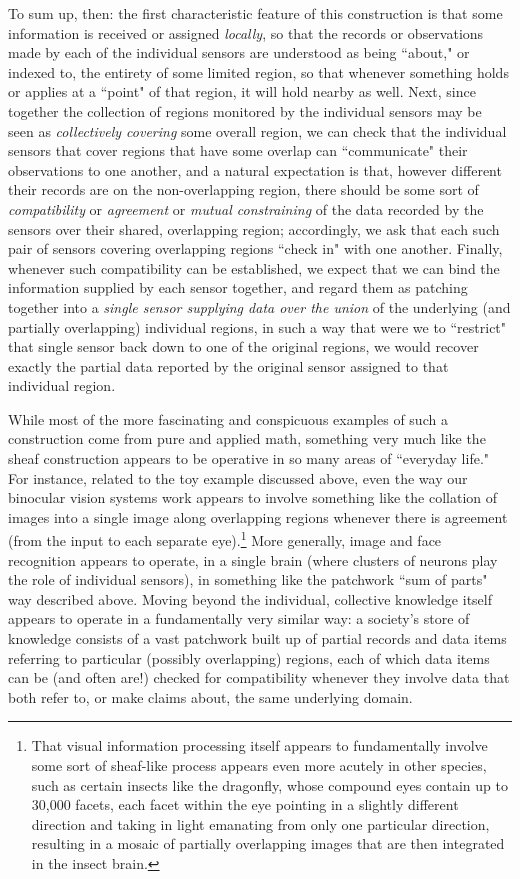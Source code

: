 \documentclass[11pt]{book}
\theoremstyle{definition}
\theoremstyle{definition}
\theoremstyle{definition}
\theoremstyle{theorem}
\theoremstyle{definition}
\begin{document}
	To sum up, then: the first characteristic feature of this construction is that some information is received or assigned \textit{locally}, so that the records or observations made by each of the individual sensors are understood as being ``about," or indexed to, the entirety of some limited region, so that whenever something holds or applies at a ``point" of that region, it will hold nearby as well. Next, since together the collection of regions monitored by the individual sensors may be seen as \textit{collectively covering} some overall region, we can check that the individual sensors that cover regions that have some overlap can ``communicate" their observations to one another, and a natural expectation is that, however different their records are on the non-overlapping region, there should be some sort of \textit{compatibility} or \textit{agreement} or \textit{mutual constraining} of the data recorded by the sensors over their shared, overlapping region; accordingly, we ask that each such pair of sensors covering overlapping regions ``check in" with one another. Finally, whenever such compatibility can be established, we expect that we can bind the information supplied by each sensor together, and regard them as patching together into a \textit{single sensor supplying data over the union} of the underlying (and partially overlapping) individual regions, in such a way that were we to ``restrict" that single sensor back down to one of the original regions, we would recover exactly the partial data reported by the original sensor assigned to that individual region. \par 
	While most of the more fascinating and conspicuous examples of such a construction come from pure and applied math, something very much like the sheaf construction appears to be operative in so many areas of ``everyday life." For instance, related to the toy example discussed above, even the way our binocular vision systems work appears to involve something like the collation of images into a single image along overlapping regions whenever there is agreement (from the input to each separate eye).\footnote{That visual information processing itself appears to fundamentally involve some sort of sheaf-like process appears even more acutely in other species, such as certain insects like the dragonfly, whose compound eyes contain up to 30,000 facets, each facet within the eye pointing in a slightly different direction and taking in light emanating from only one particular direction, resulting in a mosaic of partially overlapping images that are then integrated in the insect brain.} More generally, image and face recognition appears to operate, in a single brain (where clusters of neurons play the role of individual sensors), in something like the patchwork ``sum of parts" way described above. Moving beyond the individual, collective knowledge itself appears to operate in a fundamentally very similar way: a society's store of knowledge consists of a vast patchwork built up of partial records and data items referring to particular (possibly overlapping) regions, each of which data items can be (and often are!) checked for compatibility whenever they involve data that both refer to, or make claims about, the same underlying domain. \par 
\end{document}
